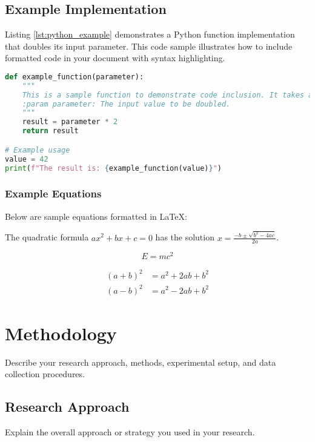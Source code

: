 \documentclass[12pt,a4paper]{report}
\begin{document}

\section{Example Implementation}
Listing \ref{lst:python_example} demonstrates a Python function implementation that doubles its input parameter. This code sample illustrates how to include formatted code in your document with syntax highlighting.

\begin{lstlisting}[language=Python, caption=Example Python Code, breaklines=true, label=lst:python_example]
def example_function(parameter):
    """
    This is a sample function to demonstrate code inclusion. It takes a parameter and returns its double.
    :param parameter: The input value to be doubled.
    """
    result = parameter * 2
    return result

# Example usage
value = 42
print(f"The result is: {example_function(value)}")
\end{lstlisting}

\subsection{Example Equations}
Below are sample equations formatted in LaTeX:

The quadratic formula $ax^2 + bx + c = 0$ has the solution $x = \frac{-b \pm \sqrt{b^2 - 4ac}}{2a}$.

\begin{equation}
    E = mc^2
\end{equation}

\begin{align}
    (a+b)^2 &= a^2 + 2ab + b^2\\
    (a-b)^2 &= a^2 - 2ab + b^2
\end{align}

\chapter{Methodology}
Describe your research approach, methods, experimental setup, and data collection procedures.

\section{Research Approach}
Explain the overall approach or strategy you used in your research.
\end{document}
